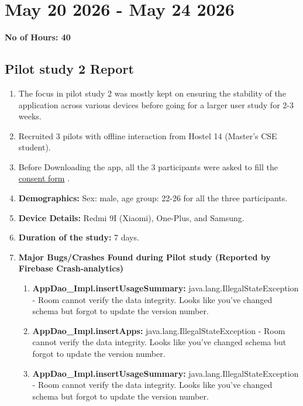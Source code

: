 \documentclass[12pt]{article}
\begin{document}
\section{May 20 2026  - May 24 2026}
{\bf No of Hours: 40}
\subsection{Pilot study 2 Report}
\begin{enumerate}
    \item The focus in pilot study 2 was mostly kept on ensuring the stability of the application across various devices before going for a larger user study for 2-3 weeks.
    \item Recruited 3 pilots with offline interaction from Hostel 14 (Master's CSE student).
    \item Before Downloading the app, all the 3 participants were asked to fill the \href{https://docs.google.com/forms/d/e/1FAIpQLScx9lyvxXDgia69XFIVvhky8M308N_4QHE2dzBAPSCAI8cA4Q/viewform}{consent form} .
    \item \textbf{Demographics: } Sex: male, age group: 22-26 for all the three participants.
    \item \textbf{Device Details: } Redmi 9I (Xiaomi), One-Plus, and Samsung.
    \item \textbf{Duration of the study:} 7 days.
    \item \textbf{Major Bugs/Crashes Found during Pilot study (Reported by Firebase Crash-analytics)}
    \begin{enumerate}
        \item \textbf{ AppDao\_Impl.insertUsageSummary:} java.lang.IllegalStateException - Room cannot verify the data integrity. Looks like you've changed schema but forgot to update the version number.
        \item \textbf{ AppDao\_Impl.insertApps:} java.lang.IllegalStateException - Room cannot verify the data integrity. Looks like you've changed schema but forgot to update the version number.
        \item \textbf{ AppDao\_Impl.insertUsageSummary:} java.lang.IllegalStateException - Room cannot verify the data integrity. Looks like you've changed schema but forgot to update the version number.
        

\end{enumerate}
\end{enumerate}
\end{document}
